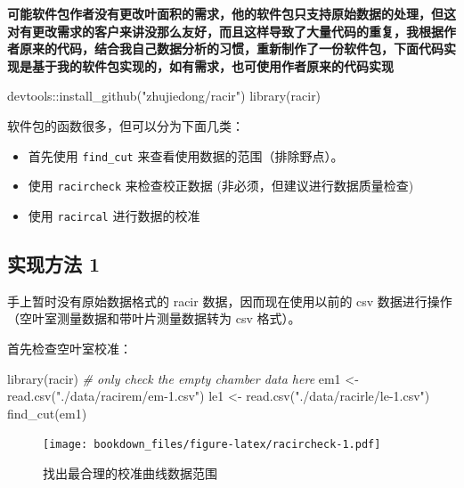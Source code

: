 \documentclass[
]{krantz}
\makeatletter
\newenvironment{Shaded}{\begin{snugshade}}{\end{snugshade}}
\newcommand{\CommentTok}[1]{\textcolor[rgb]{0.56,0.35,0.01}{\textit{#1}}}
\newcommand{\FunctionTok}[1]{\textcolor[rgb]{0.00,0.00,0.00}{#1}}
\newcommand{\NormalTok}[1]{#1}
\newcommand{\OtherTok}[1]{\textcolor[rgb]{0.56,0.35,0.01}{#1}}
\newcommand{\SpecialCharTok}[1]{\textcolor[rgb]{0.00,0.00,0.00}{#1}}
\newcommand{\StringTok}[1]{\textcolor[rgb]{0.31,0.60,0.02}{#1}}
\newenvironment{kframe}{%
\medskip{}
\setlength{\fboxsep}{.8em}
 \def\at@end@of@kframe{}%
 \ifinner\ifhmode%
  \def\at@end@of@kframe{\end{minipage}}%
  \begin{minipage}{\columnwidth}%
 \fi\fi%
 \def\FrameCommand##1{\hskip\@totalleftmargin \hskip-\fboxsep
 \colorbox{shadecolor}{##1}\hskip-\fboxsep
     \hskip-\linewidth \hskip-\@totalleftmargin \hskip\columnwidth}%
 \MakeFramed {\advance\hsize-\width
   \@totalleftmargin\z@ \linewidth\hsize
   \@setminipage}}%
 {\par\unskip\endMakeFramed%
 \at@end@of@kframe}
\renewenvironment{Shaded}{\begin{kframe}}{\end{kframe}}
\makeatother
\begin{document}
\textbf{可能软件包作者没有更改叶面积的需求，他的软件包只支持原始数据的处理，但这对有更改需求的客户来讲没那么友好，而且这样导致了大量代码的重复，我根据作者原来的代码，结合我自己数据分析的习惯，重新制作了一份软件包，下面代码实现是基于我的软件包实现的，如有需求，也可使用作者原来的代码实现}

\begin{Shaded}
\begin{Highlighting}[]
\NormalTok{devtools}\SpecialCharTok{::}\FunctionTok{install\_github}\NormalTok{(}\StringTok{"zhujiedong/racir"}\NormalTok{)}
\FunctionTok{library}\NormalTok{(racir)}
\end{Highlighting}
\end{Shaded}

软件包的函数很多，但可以分为下面几类：

\begin{itemize}
\item
  首先使用 \texttt{find\_cut} 来查看使用数据的范围（排除野点）。
\item
  使用 \texttt{racircheck} 来检查校正数据 (非必须，但建议进行数据质量检查)
\item
  使用 \texttt{racircal} 进行数据的校准
\end{itemize}

\hypertarget{racir_pkg_1}{%
\subsection{实现方法 1}\label{racir_pkg_1}}

手上暂时没有原始数据格式的 racir 数据，因而现在使用以前的 csv 数据进行操作（空叶室测量数据和带叶片测量数据转为 csv 格式）。

首先检查空叶室校准：

\begin{Shaded}
\begin{Highlighting}[]
\FunctionTok{library}\NormalTok{(racir)}
\CommentTok{\# only check the empty chamber data here}
\NormalTok{em1 }\OtherTok{\textless{}{-}} \FunctionTok{read.csv}\NormalTok{(}\StringTok{"./data/racirem/em{-}1.csv"}\NormalTok{)}
\NormalTok{le1 }\OtherTok{\textless{}{-}} \FunctionTok{read.csv}\NormalTok{(}\StringTok{"./data/racirle/le{-}1.csv"}\NormalTok{)}
\FunctionTok{find\_cut}\NormalTok{(em1)}
\end{Highlighting}
\end{Shaded}

\begin{figure}
\centering
\texttt{[image: bookdown\_files/figure-latex/racircheck-1.pdf]}
\caption{\label{fig:racircheck}找出最合理的校准曲线数据范围}
\end{figure}
\end{document}
